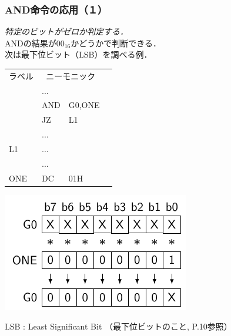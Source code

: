 \documentclass[handout]{beamer}        %
\begin{document}
\begin{frame}
  \frametitle{AND命令の応用（１）}
  \emph{特定のビットがゼロか判定する．} \\
  ANDの結果が$00_{16}$かどうかで判断できる．\\
  次は最下位ビット（LSB）を調べる例．\\
  \vfill
  \begin{minipage}{0.48\columnwidth}
    {\small\ttfamily\begin{center}
      \begin{tabular}{|l|l l|l}
        \cline{1-3}
        ラベル & \multicolumn{2}{|c|}{ニーモニック} & \\
        \cline{1-3}
        & ...  &        & \\
        & AND  & G0,ONE & \\
        & JZ   & L1     & \\
        & ...  &        & \\
        L1  & ...  &        & \\
        & ...  &        & \\
        ONE & DC   & 01H    & \\
        \cline{1-3}
      \end{tabular}
    \end{center}}
  \end{minipage}
  \begin{minipage}{0.48\columnwidth}
    \centerline{\includegraphics[scale=0.8]{../Tikz/land3.pdf}}
  \end{minipage}
  \vfill
  LSB : Least Significant Bit （最下位ビットのこと, P.10参照）
  \vfill
\end{frame}
\end{document}
